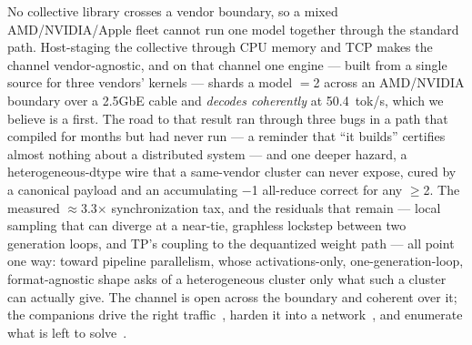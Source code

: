 \documentclass[11pt]{article}
\begin{document}
No collective library crosses a vendor boundary, so a mixed AMD/NVIDIA/Apple fleet cannot run one model
together through the standard path. Host-staging the collective through CPU memory and TCP makes the
channel vendor-agnostic, and on that channel one engine --- built from a single source for three vendors'
kernels --- shards a model $=$2 across an AMD/NVIDIA boundary over a 2.5GbE cable and
\emph{decodes coherently} at 50.4~tok/s, which we believe is a first. The road to that result ran through
three bugs in a path that compiled for months but had never run --- a reminder that ``it builds''
certifies almost nothing about a distributed system --- and one deeper hazard, a heterogeneous-dtype wire
that a same-vendor cluster can never expose, cured by a canonical  payload and an accumulating
$-$1 all-reduce correct for any $\geq$2. The measured $\approx$3.3$\times$
synchronization tax, and the residuals that remain --- local sampling that can diverge at a near-tie,
graphless lockstep between two generation loops, and TP's coupling to the dequantized weight path --- all
point one way: toward pipeline parallelism, whose activations-only, one-generation-loop, format-agnostic
shape asks of a heterogeneous cluster only what such a cluster can actually give. The channel is open
across the boundary and coherent over it; the companions drive the right traffic~\cite{latency}, harden
it into a network~\cite{consensus}, and enumerate what is left to solve~\cite{openproblems}.
\end{document}
